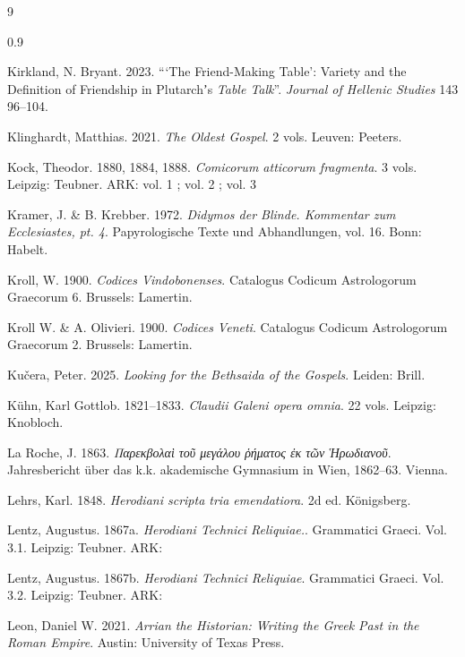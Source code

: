 \begin{thebibliography}{9}
\begin{spacing}{0.9}
\begin{small}
Kirkland, N. Bryant. 2023. %
“‘The Friend-Making Table’: Variety and the Definition of Friendship in Plutarchʼs \textit{Table Talk}”. %
\textit{Journal of Hellenic Studies} 143 96--104. %

Klinghardt, Matthias. 2021. %
\textit{The Oldest Gospel}. 2 vols. %
Leuven: Peeters. %

Kock, Theodor. 1880, 1884, 1888. \textit{Comicorum atticorum fragmenta}. %
3 vols. Leipzig: Teubner. %
ARK: vol. 1 ; vol. 2 ; vol. 3  %

Kramer, J. \& B. Krebber. 1972. %
\textit{Didymos der Blinde. Kommentar zum Ecclesiastes, pt. 4}. %
Papyrologische Texte und Abhandlungen, vol. 16. %
Bonn: Habelt. %

Kroll, W. 1900. \textit{Codices Vindobonenses}. %
Catalogus Codicum Astrologorum Graecorum 6. %
Brussels: Lamertin.

Kroll W. \& A. Olivieri. 1900. %
\textit{Codices Veneti}. %
Catalogus Codicum Astrologorum Graecorum 2. %
Brussels: Lamertin. %

Kučera, Peter. 2025. %
\textit{Looking for the Bethsaida of the Gospels}. %
Leiden: Brill. %

Kühn, Karl Gottlob. 1821--1833. %
\textit{Claudii Galeni opera omnia}. 22 vols. %
Leipzig: Knobloch. %

La Roche, J. 1863. %
\textit{Παρεκβολαὶ τοῦ μεγάλου ῥήματος ἐκ τῶν Ἡρωδιανοῦ}. %
Jahresbericht über das k.k. akademische Gymnasium in Wien, 1862--63. %
Vienna. %

Lehrs, Karl. 1848. %
\textit{Herodiani scripta tria emendatiora}. %
2d ed. Königsberg. %

Lentz, Augustus. 1867a. %
\textit{Herodiani Technici Reliquiae.}. %
Grammatici Graeci. Vol. 3.1. %
Leipzig: Teubner. %
ARK:  %

Lentz, Augustus. 1867b. %
\textit{Herodiani Technici Reliquiae}. %
Grammatici Graeci. Vol. 3.2. %
Leipzig: Teubner. %
ARK:  %
%

Leon, Daniel W. 2021. %
\textit{Arrian the Historian: Writing the Greek Past in the Roman Empire}. %
Austin: University of Texas Press. %


\end{small}
\end{spacing}
\end{thebibliography}
